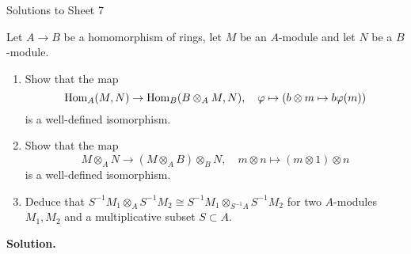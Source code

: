 \documentclass[a4paper,11pt]{article}
\begin{document}
\begin{center}
    \huge{Solutions to Sheet 7}
\end{center}

Let $A \to B$ be a homomorphism of rings, let $M$ be an $A$-module and 
let $N$ be a $B$-module. 
\begin{enumerate}
    \item Show that the map
        \begin{equation*}
            \operatorname{Hom}_A(M,N) \to \operatorname{Hom}_B(B \otimes_A M, N), \quad
            \varphi \mapsto (b \otimes m \mapsto b \varphi(m))
        \end{equation*}
        is a well-defined isomorphism.

    \item Show that the map
        \begin{equation*}
            M \otimes_A N \to (M \otimes_A B) \otimes_B N, \quad
            m \otimes n \mapsto (m \otimes 1) \otimes n
        \end{equation*}
        is a well-defined isomorphism. 

    \item Deduce that $S^{-1} M_1 \otimes_A S^{-1}M_2 \cong
        S^{-1} M_1 \otimes_{S^{-1}A} S^{-1} M_2$
        for two $A$-modules $M_1, M_2$ and a multiplicative subset 
        $S \subset A$. 
\end{enumerate}
\textbf{Solution.}
\end{document}
